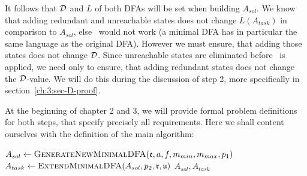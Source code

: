 It follows that $\mathcal{D}$ and $L$ of both DFAs will be set when building $A_{sol}$. We know that adding redundant and unreachable states does not change $L(A_{task})$ in comparison to $A_{sol}$, else \MinAlg\ would not work (a minimal DFA has in particular the same language as the original DFA). However we must ensure, that adding those states does not change $\mathcal{D}$. Since unreachable states are eliminated before \CompDist\ is applied, we need only to ensure, that adding redundant states does not change the $\mathcal{D}$-value. We will do this during the discussion of step 2, more specifically in section~\ref{ch:3:sec-D-proof}.

At the beginning of chapter 2 and 3, we will provide formal problem definitions for both steps, that specify precisely all requirements. Here we shall content ourselves with the definition of the main algorithm:
\vspace{0.2cm}
\begin{algorithmic}[1]
	\State $A_{sol} \gets \textsc{GenerateNewMinimalDFA}(\mathfrak{e}, a, f, m_{min}, m_{max}, p_1)$
	\State $A_{task} \gets \textsc{ExtendMinimalDFA}(A_{sol}, p_2, \mathfrak{r},\mathfrak{u})$
	\State \Return $A_{sol}, A_{task}$
	\EndFunction
\end{algorithmic}


